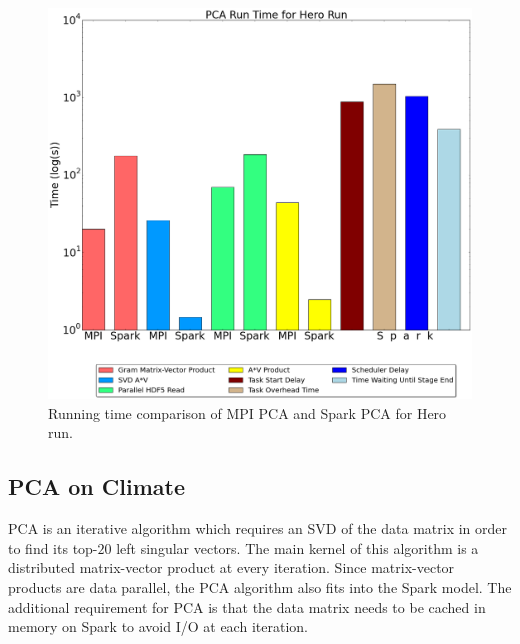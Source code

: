 \begin{figure}[th!]
\centering
\includegraphics[width=.4\textwidth]{fig/hero_run_summary.png}
\caption{Running time comparison of MPI PCA and Spark PCA for Hero run.}
\label{fig:hero}
\end{figure}

\subsection{PCA on Climate}

PCA is an iterative algorithm which requires an SVD of the data matrix in order to find its top-$20$ left singular vectors. The main kernel of this algorithm is a distributed matrix-vector product at every iteration. Since matrix-vector products are data parallel, the PCA algorithm also fits into the Spark model. The additional requirement for PCA is that the data matrix needs to be cached in memory on Spark to avoid I/O at each iteration.

